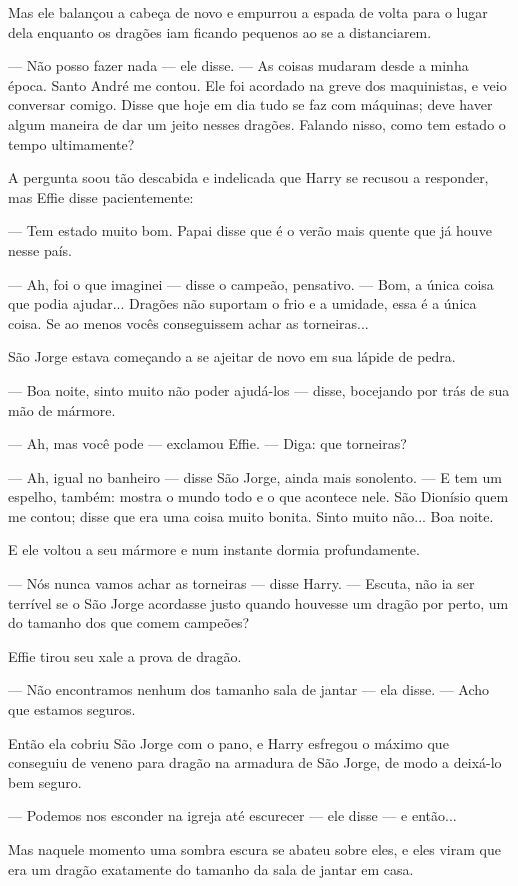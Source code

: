 Mas ele balançou a cabeça de novo e empurrou a espada de volta para o
lugar dela enquanto os dragões iam ficando pequenos ao se a
distanciarem.

— Não posso fazer nada — ele disse. — As coisas mudaram desde a minha
época. Santo André me contou. Ele foi acordado na greve dos
maquinistas, e veio conversar comigo. Disse que hoje em dia tudo se
faz com máquinas; deve haver algum maneira de dar um jeito nesses
dragões. Falando nisso, como tem estado o tempo ultimamente?

A pergunta soou tão descabida e indelicada que Harry se recusou a
responder, mas Effie disse pacientemente:

— Tem estado muito bom. Papai disse que é o verão mais quente que já
houve nesse país.

— Ah, foi o que imaginei — disse o campeão, pensativo. — Bom, a única
coisa que podia ajudar... Dragões não suportam o frio e a umidade,
essa é a única coisa. Se ao menos vocês conseguissem achar as
torneiras...

São Jorge estava começando a se ajeitar de novo em sua lápide de
pedra.

— Boa noite, sinto muito não poder ajudá-los — disse, bocejando por
trás de sua mão de mármore.

— Ah, mas você pode — exclamou Effie. — Diga: que torneiras?

— Ah, igual no banheiro — disse São Jorge, ainda mais sonolento. — E
tem um espelho, também: mostra o mundo todo e o que acontece nele.
São Dionísio quem me contou; disse que era uma coisa muito bonita.
Sinto muito não... Boa noite.

E ele voltou a seu mármore e num instante dormia profundamente.

— Nós nunca vamos achar as torneiras — disse Harry. — Escuta, não ia
ser terrível se o São Jorge acordasse justo quando houvesse um dragão
por perto, um do tamanho dos que comem campeões?

Effie tirou seu xale a prova de dragão.

— Não encontramos nenhum dos tamanho sala de jantar — ela disse. —
Acho que estamos seguros.

Então ela cobriu São Jorge com o pano, e Harry esfregou o máximo que
conseguiu de veneno para dragão na armadura de São Jorge, de modo a
deixá-lo bem seguro.

— Podemos nos esconder na igreja até escurecer — ele disse — e
então...

Mas naquele momento uma sombra escura se abateu sobre eles, e eles
viram que era um dragão exatamente do tamanho da sala de jantar em
casa.


